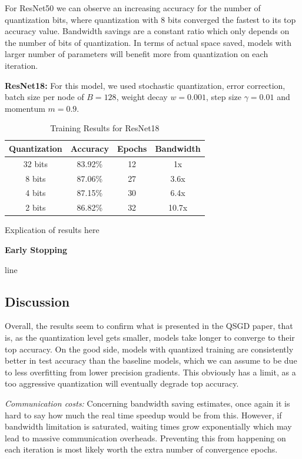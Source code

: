 \documentclass[10pt,conference,compsocconf]{IEEEtran}
\begin{document}
\vspace{-1.5em}
For ResNet50 we can observe an increasing accuracy for the number of quantization bits, where quantization with 8 bits converged the fastest to its top accuracy value.
Bandwidth savings are a constant ratio which only depends on the number of bits of quantization. In terms of actual space saved, models with larger number of parameters will benefit more from quantization on each iteration.
\vspace{0.3em}

\textbf{ResNet18:} For this model, we used stochastic quantization, error correction, batch size per node of $B = 128$, weight decay $w = 0.001$, step size $\gamma = 0.01$ and momentum $m = 0.9$.

\begin{table}[htbp]
  \centering
  \begin{tabular}[c]{|c||c|c|c|}
    \hline
	  Quantization&Accuracy&Epochs&Bandwidth\\
    \hline
	  32 bits&83.92\% &12&1x\\
	  8 bits&87.06\%&27&3.6x\\
	  4 bits&87.15\%&30&6.4x\\
	  2 bits&86.82\%&32&10.7x\\
    \hline
  \end{tabular}
	\vspace{0.7em}
	\caption{Training Results for ResNet18}
\end{table}
\vspace{-1.5em}


Explication of results here 

\textbf{Early Stopping}

line
\vspace{0.3em}


\subsection{Discussion}


Overall, the results seem to confirm what is presented in the QSGD paper, that is, as the quantization level gets smaller, models take longer to converge to their top accuracy. On the good side, models with quantized training are consistently better in test accuracy than the baseline models, which we can assume to be due to less overfitting from lower precision gradients. This obviously has a limit, as a too aggressive quantization will eventually degrade top accuracy.

\textit{Communication costs:} Concerning bandwidth saving estimates, once again it is hard to say how much the real time speedup would be from this. However, if bandwidth limitation is saturated, waiting times grow exponentially which may lead to massive communication overheads. Preventing this from happening on each iteration is most likely worth the extra number of convergence epochs. 
\end{document}
